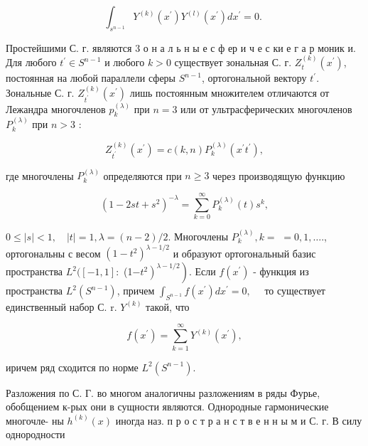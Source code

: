 \documentclass[10pt]{article}
\begin{document}
\[

\int_{s^{n-1}} Y^{(k)}\left(x^{\prime}\right) Y^{(l)}\left(x^{\prime}\right) d x^{\prime}=0 \text {. }

\]



Простейшими С. г. являются 3 о н а л ь н ы е с ф ер и ч е с ки е г а р моник и. Для любого $t^{\prime} \in S^{n-1}$ и любого $k>0$ существует зональная С. г. $Z_{t}^{(k)}\left(x^{\prime}\right)$, постоянная на любой параллели сферы $S^{n-1}$, ортогональной вектору $t^{\prime}$. Зональные С. г. $Z_{t^{\prime}}^{(k)}\left(x^{\prime}\right)$ лишь постоянным множителем отличаются от Лежандра многочленов $p_{k}^{(\lambda)}$ при $n=3$ или от ультрасферических многочленов $P_{k}^{(\lambda)}$ при $n>3$ :



\[

Z_{t^{\prime}}^{(k)}\left(x^{\prime}\right)=c(k, n) P_{k}^{(\lambda)}\left(x^{\prime} t^{\prime}\right),

\]



где многочлены $P_{k}^{(\lambda)}$ определяются при $n \geqslant 3$ через производящую функцию



\[

\left(1-2 s t+s^{2}\right)^{-\lambda}=\sum_{k=0}^{\infty} P_{k}^{(\lambda)}(t) s^{k},

\]



$0 \leqslant|s|<1, \quad|t|=1, \lambda=(n-2) / 2$. Многочлены $P_{k}^{(\lambda)}, k=$ $=0,1, \ldots .$, ортогональны с весом $\left(1-t^{2}\right)^{\lambda-1 / 2}$ и образуют ортогональный базис пространства $L^{2}([-1,1]:$ (1$\left.\left.-t^{2}\right)^{\lambda-1 / 2}\right)$. Если $f\left(x^{\prime}\right)$ - функция из пространства $L^{2}\left(S^{n-1}\right)$, причем $\int_{S^{n-1}} f\left(x^{\prime}\right) d x^{\prime}=0, \quad$ то существует единственный набор С. r. $Y^{(k)}$ такой, что



\[

f\left(x^{\prime}\right)=\sum_{k=1}^{\infty} Y^{(k)}\left(x^{\prime}\right),

\]



иричем ряд сходится по норме $L^{2}\left(S^{n-1}\right)$.



Разложения по С. Г. во многом аналогичны разложениям в ряды Фурье, обобщением к-рых они в сущности являются. Однородные гармонические многочле- ны $h^{(k)}(x)$ иногда наз. п р о с т р а н с т в е н н ы м и С. г. В силу однородности
\end{document}
